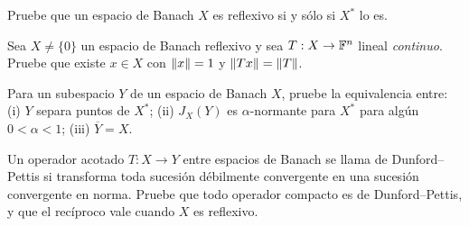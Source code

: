 \begin{ejercicio}\label{ej:v3-l18-2}
Pruebe que un espacio de Banach $X$ es reflexivo si y sólo si $X^*$ lo es.
\end{ejercicio}


\begin{ejercicio}\label{ej:v3-l18-3}
Sea $X\ne\{0\}$ un espacio de Banach reflexivo y sea $T:X\to\mathbb F^n$ lineal \emph{continuo}. Pruebe que existe $x\in X$ con $\left\lVert x\right\rVert=1$ y $\left\lVert Tx\right\rVert=\left\lVert T\right\rVert$.
\end{ejercicio}


\begin{ejercicio}\label{ej:v3-l18-4}
Para un subespacio $Y$ de un espacio de Banach $X$, pruebe la equivalencia entre: (i) $Y$ separa puntos de $X^*$; (ii) $J_X(Y)$ es $\alpha$-normante para $X^*$ para algún $0<\alpha<1$; (iii) $\overline Y=X$.
\end{ejercicio}


\begin{ejercicio}\label{ej:v3-l18-5}
Un operador acotado $T:X\to Y$ entre espacios de Banach se llama de Dunford--Pettis si transforma toda sucesión débilmente convergente en una sucesión convergente en norma. Pruebe que todo operador compacto es de Dunford--Pettis, y que el recíproco vale cuando $X$ es reflexivo.
\end{ejercicio}
